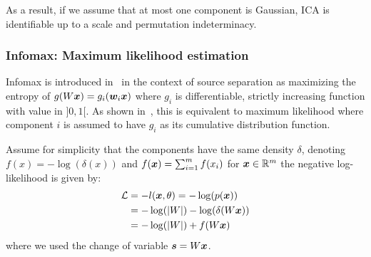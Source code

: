 As a result, if we assume that at most one component is Gaussian, ICA is identifiable up to a scale and permutation indeterminacy.

\subsubsection{Infomax: Maximum likelihood estimation}
Infomax is introduced in~\cite{bell1995information} in the context of source
separation as maximizing the entropy of $g(W \boldsymbol{x}) = g_i(\boldsymbol{w}_i \boldsymbol{x})$ where  $g_i$
is differentiable, strictly increasing function with value in $]0, 1[$. As shown
in~\cite{cois1997infomax}, this is equivalent to
maximum likelihood where component $i$ is assumed to have $g_i$ as its
cumulative distribution function.

Assume for simplicity that the components have the same density $\delta$, denoting $f(x) =
-\log(\delta(x))$ and $f(\boldsymbol{x}) = \sum_{i=1}^m f(x_i)$ for $\boldsymbol{x} \in
\mathbb{R}^m$ the negative log-likelihood is given by:
\begin{align}
  \mathcal{L} &= -l(\boldsymbol{x}, \theta) = - \log(p(\boldsymbol{x})) \\
        &= -\log(|W|) - \log(\delta(W \boldsymbol{x})) \\
  &= -\log(|W|) + f(W \boldsymbol{x})
\end{align}
where we used the change of variable $\boldsymbol{s} = W \boldsymbol{x}$.

